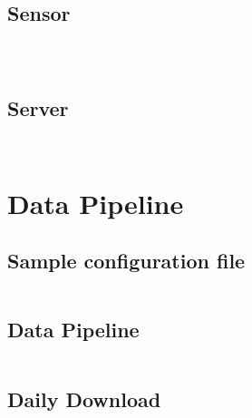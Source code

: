\subsection{Sensor} \label{appendix:pilot:sensor}
\vspace{1em}
\inputminted{javascript}{tools/pilot-study/sensor-package.json}
\inputminted{javascript}{tools/pilot-study/sensor-collect.js}
\inputminted{bash}{tools/pilot-study/sensor-collect.sh}

\subsection{Server} \label{appendix:pilot:server}
\vspace{1em}
\inputminted{javascript}{tools/pilot-study/server-package.json}
\inputminted{javascript}{tools/pilot-study/server-server.js}

\section{Data Pipeline}\label{appendix:data:pipeline}

\subsection{Sample configuration file } 
\vspace{1em}
\inputminted{javascript}{tools/pipeline/config_sample.json}

\subsection{Data Pipeline}
\vspace{1em}
\inputminted{bash}{tools/pipeline/pipeline}

\subsection{Daily Download}
\vspace{1em}
\inputminted{bash}{tools/pipeline/daily}

